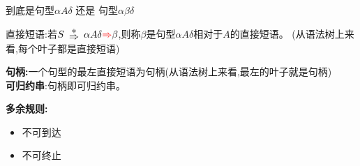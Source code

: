 \documentclass[UTF8,a4paper]{ctexart}
\newcommand{\spaceline}{\vspace{\baselineskip}}
\begin{document}
  {\color{red}到底是句型$\alpha A \delta$ 还是 句型$\alpha \beta \delta$}

  直接短语:若$\renewcommand{\arraystretch}{0.5}S\begin{array}{c} * \\ \Rightarrow \end{array} \alpha A\delta
   {\color{red}\Rightarrow}  \beta$,则称$\beta$是句型{\color{red}$\alpha A \delta$}相对于$A$的直接短语。
   (从语法树上来看,每个叶子都是直接短语)

   \textbf{句柄:}一个句型的最左直接短语为句柄(从语法树上来看,最左的叶子就是句柄)\\
   \textbf{可归约串}:句柄即可归约串。

   \spaceline
   \textbf{多余规则:}
   \begin{itemize}
     \item 不可到达
     \item 不可终止
   \end{itemize}
\end{document}
